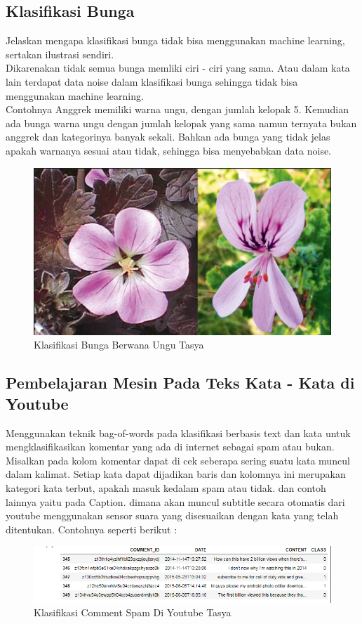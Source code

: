 \subsection{Klasifikasi Bunga}
Jelaskan mengapa klasifikasi bunga tidak bisa menggunakan machine learning, sertakan ilustrasi sendiri.\\
Dikarenakan tidak semua bunga memliki ciri - ciri yang sama. Atau dalam kata lain terdapat data noise dalam klasifikasi bunga sehingga tidak bisa menggunakan machine learning.\\
Contohnya Anggrek memiliki warna ungu, dengan jumlah kelopak 5. Kemudian ada bunga warna ungu dengan jumlah kelopak yang sama namun ternyata bukan anggrek dan kategorinya banyak sekali. Bahkan ada bunga yang tidak jelas apakah warnanya sesuai atau tidak, sehingga bisa menyebabkan data noise.
\begin{figure}[ht]
\centering
\includegraphics[scale=0.5]{figures/chapter4tasya2.png}
\caption{Klasifikasi Bunga Berwana Ungu Tasya}
\label{Contoh}
\end{figure}

\subsection{Pembelajaran Mesin Pada Teks Kata - Kata di Youtube}
Menggunakan teknik bag-of-words pada klasifikasi berbasis text dan kata untuk mengklasifikasikan komentar yang ada di internet sebagai spam atau bukan. Misalkan pada kolom komentar dapat di cek seberapa sering suatu kata muncul dalam kalimat. Setiap kata dapat dijadikan baris dan kolomnya ini merupakan kategori kata terbut, apakah masuk kedalam spam atau tidak. dan contoh lainnya yaitu pada Caption. dimana akan muncul subtitle secara otomatis dari youtube menggunakan sensor suara yang disesuaikan dengan kata yang telah ditentukan. Contohnya seperti berikut :
\begin{figure}[ht]
\centering
\includegraphics[scale=0.5]{figures/chapter4tasya3.png}
\caption{Klasifikasi Comment Spam Di Youtube Tasya}
\label{Contoh}
\end{figure}

